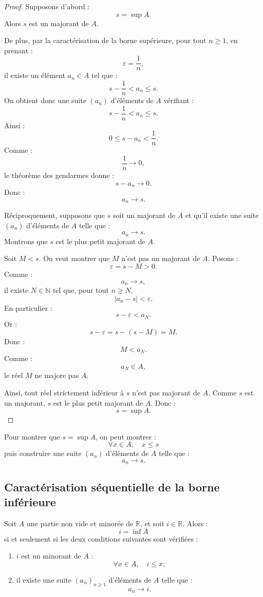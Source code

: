\documentclass[11pt,a4paper]{article}
\newcommand{\N}{\mathbb N}
\newcommand{\R}{\mathbb R}
\begin{document}
\begin{proof}
Supposons d'abord :
\[
s=\sup A.
\]
Alors \(s\) est un majorant de \(A\).

De plus, par la caractérisation de la borne supérieure, pour tout \(n\geq1\), en prenant :
\[
\varepsilon=\frac1n,
\]
il existe un élément \(a_n\in A\) tel que :
\[
s-\frac1n<a_n\leq s.
\]
On obtient donc une suite \((a_n)\) d'éléments de \(A\) vérifiant :
\[
s-\frac1n<a_n\leq s.
\]
Ainsi :
\[
0\leq s-a_n<\frac1n.
\]
Comme :
\[
\frac1n\longrightarrow0,
\]
le théorème des gendarmes donne :
\[
s-a_n\longrightarrow0.
\]
Donc :
\[
a_n\longrightarrow s.
\]

Réciproquement, supposons que \(s\) soit un majorant de \(A\) et qu'il existe une suite \((a_n)\) d'éléments de \(A\) telle que :
\[
a_n\to s.
\]
Montrons que \(s\) est le plus petit majorant de \(A\).

Soit \(M<s\).  
On veut montrer que \(M\) n'est pas un majorant de \(A\).  
Posons :
\[
\varepsilon=s-M>0.
\]
Comme :
\[
a_n\to s,
\]
il existe \(N\in\N\) tel que, pour tout \(n\geq N\),
\[
|a_n-s|<\varepsilon.
\]
En particulier :
\[
s-\varepsilon<a_N.
\]
Or :
\[
s-\varepsilon=s-(s-M)=M.
\]
Donc :
\[
M<a_N.
\]
Comme :
\[
a_N\in A,
\]
le réel \(M\) ne majore pas \(A\).

Ainsi, tout réel strictement inférieur à \(s\) n'est pas majorant de \(A\).  
Comme \(s\) est un majorant, \(s\) est le plus petit majorant de \(A\).  
Donc :
\[
s=\sup A.
\]
\end{proof}

\begin{retenirbox}
Pour montrer que \(s=\sup A\), on peut montrer :
\[
\forall x\in A,\quad x\leq s
\]
puis construire une suite \((a_n)\) d'éléments de \(A\) telle que :
\[
a_n\to s.
\]
\end{retenirbox}

\subsection{Caractérisation séquentielle de la borne inférieure}

\begin{theorembox}
Soit \(A\) une partie non vide et minorée de \(\R\), et soit \(i\in\R\).  
Alors :
\[
i=\inf A
\]
si et seulement si les deux conditions suivantes sont vérifiées :
\begin{enumerate}
    \item \(i\) est un minorant de \(A\) :
    \[
    \forall x\in A,\quad i\leq x ;
    \]
    \item il existe une suite \((a_n)_{n\geq1}\) d'éléments de \(A\) telle que :
    \[
    a_n\longrightarrow i.
    \]
\end{enumerate}
\end{theorembox}
\end{document}
